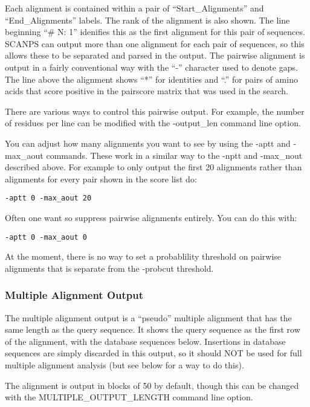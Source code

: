 \documentclass[12pt]{article}
\begin{document}
Each alignment is contained within a pair of ``Start\_Alignments'' and
``End\_Alignments'' labels.  The rank of the alignment is also shown.
The line beginning ``\# N: 1'' idenifies this as the first alignment
for this pair of sequences.  SCANPS can output more than one alignment
for each pair of sequences, so this allows these to be separated and
parsed in the output.  The pairwise alignment is output in a fairly
conventional way with the ``-'' character used to denote gaps.  The
line above the alignment shows ``*'' for identities and ``.'' for
pairs of amino acids that score positive in the pairscore matrix that
was used in the search.

There are various ways to control this pairwise output.  For example,
the number of residues per line can be modified with the -output\_len
command line option.

You can adjust how many alignments you want to see by using the -aptt
and -max\_aout commands.  These work in a similar way to the -nptt and
-max\_nout described above.  For example to only output the first 20
alignments rather than alignments for every pair shown in the score
list do:

\begin{verbatim}
-aptt 0 -max_aout 20
\end{verbatim}

Often one want so suppress pairwise alignments entirely.  You can do this with:

\begin{verbatim}
-aptt 0 -max_aout 0
\end{verbatim}

At the moment, there is no way to set a probablility threshold on
pairwise alignments that is separate from the -probcut threshold.


\subsubsection{Multiple Alignment Output}

The multiple alignment output is a ``pseudo'' multiple alignment that
has the same length as the query sequence.  It shows the query
sequence as the first row of the alignment, with the database
sequences below.  Insertions in database sequences are simply
discarded in this output, so it should NOT be used for full multiple
alignment analysis (but see below for a way to do this). 

The alignment is output in blocks of 50 by default, though this can be
changed with the MULTIPLE\_OUTPUT\_LENGTH command line option.
\end{document}
